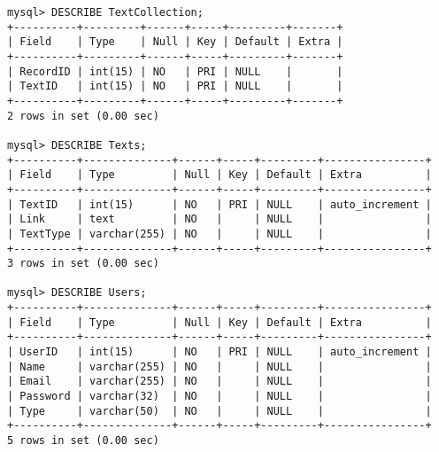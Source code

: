 \begin{verbatim}
mysql> DESCRIBE TextCollection;
+----------+---------+------+-----+---------+-------+
| Field    | Type    | Null | Key | Default | Extra |
+----------+---------+------+-----+---------+-------+
| RecordID | int(15) | NO   | PRI | NULL    |       |
| TextID   | int(15) | NO   | PRI | NULL    |       |
+----------+---------+------+-----+---------+-------+
2 rows in set (0.00 sec)

mysql> DESCRIBE Texts;
+----------+--------------+------+-----+---------+----------------+
| Field    | Type         | Null | Key | Default | Extra          |
+----------+--------------+------+-----+---------+----------------+
| TextID   | int(15)      | NO   | PRI | NULL    | auto_increment |
| Link     | text         | NO   |     | NULL    |                |
| TextType | varchar(255) | NO   |     | NULL    |                |
+----------+--------------+------+-----+---------+----------------+
3 rows in set (0.00 sec)

mysql> DESCRIBE Users;
+----------+--------------+------+-----+---------+----------------+
| Field    | Type         | Null | Key | Default | Extra          |
+----------+--------------+------+-----+---------+----------------+
| UserID   | int(15)      | NO   | PRI | NULL    | auto_increment |
| Name     | varchar(255) | NO   |     | NULL    |                |
| Email    | varchar(255) | NO   |     | NULL    |                |
| Password | varchar(32)  | NO   |     | NULL    |                |
| Type     | varchar(50)  | NO   |     | NULL    |                |
+----------+--------------+------+-----+---------+----------------+
5 rows in set (0.00 sec)
\end{verbatim}
